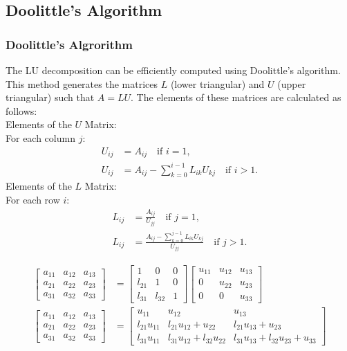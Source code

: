 \documentclass{beamer}
\theoremstyle{remark}
\numberwithin{equation}{section}
\begin{document}
\subsection{Doolittle's Algorithm}
\begin{frame}
	\frametitle{Doolittle's Algrorithm}
	The LU decomposition can be efficiently computed using Doolittle's algorithm. This method generates the matrices \( L \) (lower triangular) and \( U \) (upper triangular) such that \( A = LU \). The elements of these matrices are calculated as follows: \\
	Elements of the \( U \) Matrix:  \\
	For each column \( j \):
	\begin{align}
		U_{ij} &= A_{ij} \quad \text{if } i = 1, \\
		U_{ij} &= A_{ij} - \sum_{k=0}^{i-1} L_{ik} U_{kj} \quad \text{if } i > 1.
	\end{align}
	Elements of the \( L \) Matrix: \\
	For each row \( i \):
	\begin{align}
		L_{ij} &= \frac{A_{ij}}{U_{jj}} \quad \text{if } j = 1, \\
		L_{ij} &= \frac{A_{ij} - \sum_{k=0}^{j-1} L_{ik} U_{kj}}{U_{jj}} \quad \text{if } j > 1.
	\end{align}
\end{frame}
\begin{frame}
	\begin{align}
		\begin{bmatrix}
			a_{11} & a_{12} &a_{13} \\
			a_{21} & a_{22} & a_{23} \\
			a_{31} & a_{32} & a_{33}
		\end{bmatrix}
		&=
		\begin{bmatrix}
			1 & 0 & 0 \\
			l_{21} & 1 & 0 \\
			l_{31} & l_{32} & 1
		\end{bmatrix}
		\begin{bmatrix}
			u_{11} & u_{12} & u_{13} \\
			0 & u_{22} & u_{23} \\
			0 & 0 & u_{33}
		\end{bmatrix} \\ 
		\begin{bmatrix}
		a_{11} & a_{12} &a_{13} \\
		a_{21} & a_{22} & a_{23} \\
		a_{31} & a_{32} & a_{33}
		\end{bmatrix}
		&=
		\begin{bmatrix}
			u_{11} & u_{12} & u_{13} \\
			l_{21}u_{11} & l_{21}u_{12} + u_{22} & l_{21}u_{13} + u_{23} \\
			l_{31}u_{11} & l_{31}u_{12} + l_{32}u_{22} & l_{31}u_{13} + l_{32}u_{23} + u_{33}
		\end{bmatrix}
	\end{align}
\end{frame}
\end{document}

